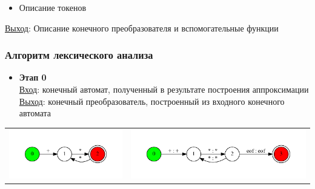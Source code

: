 \documentclass{beamer}
\begin{document}
\begin{frame}[fragile]
\begin{itemize}
\item Описание токенов
\end{itemize}

\underline{Выход}: Описание конечного преобразователя и вспомогательные функции
\end{frame}

\begin{frame}[fragile]
\transwipe[direction=90]
\frametitle{Алгоритм лексического анализа}
\begin{itemize}
\item \textbf{Этап 0} \\
\underline{Вход}: конечный автомат, полученный в результате построения аппроксимации \\
\underline{Выход}: конечный преобразователь, построенный из входного конечного автомата
\end{itemize}

\begin{tabular}{l r}
     \begin{minipage}{.35\textwidth} 
     \includegraphics[width=\linewidth]{calc_ex}
     \end{minipage}  
     & 
    \begin{minipage}{.55\textwidth}    
     \includegraphics[width=\linewidth]{calc_ex_fst}
    \end{minipage} \\
\end{tabular} 
\end{frame}
\end{document}
